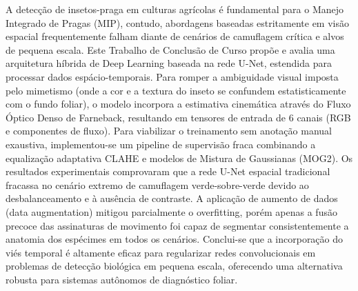 
\begin{resumoutfpr}%
A detecção de insetos-praga em culturas agrícolas é fundamental para o Manejo Integrado de Pragas (MIP), contudo, abordagens baseadas estritamente em visão espacial frequentemente falham diante de cenários de camuflagem crítica e alvos de pequena escala. Este Trabalho de Conclusão de Curso propõe e avalia uma arquitetura híbrida de Deep Learning baseada na rede U-Net, estendida para processar dados espácio-temporais. Para romper a ambiguidade visual imposta pelo mimetismo (onde a cor e a textura do inseto se confundem estatisticamente com o fundo foliar), o modelo incorpora a estimativa cinemática através do Fluxo Óptico Denso de Farneback, resultando em tensores de entrada de 6 canais (RGB e componentes de fluxo). Para viabilizar o treinamento sem anotação manual exaustiva, implementou-se um pipeline de supervisão fraca combinando a equalização adaptativa CLAHE e modelos de Mistura de Gaussianas (MOG2). Os resultados experimentais comprovaram que a rede U-Net espacial tradicional fracassa no cenário extremo de camuflagem verde-sobre-verde devido ao desbalanceamento e à ausência de contraste. A aplicação de aumento de dados (data augmentation) mitigou parcialmente o overfitting, porém apenas a fusão precoce das assinaturas de movimento foi capaz de segmentar consistentemente a anatomia dos espécimes em todos os cenários. Conclui-se que a incorporação do viés temporal é altamente eficaz para regularizar redes convolucionais em problemas de detecção biológica em pequena escala, oferecendo uma alternativa robusta para sistemas autônomos de diagnóstico foliar.
\end{resumoutfpr}

